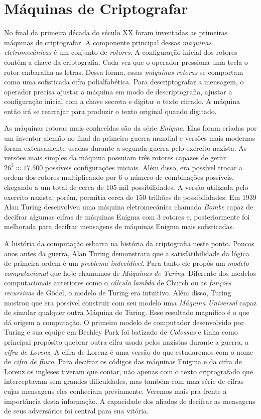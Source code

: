 \section{Máquinas de Criptografar}
\label{sec:maquinas}

No final da primeira década do século XX foram inventadas as primeiras máquinas de criptografar.
A componente principal dessas {\em maquinas eletromecânicas} é um conjunto de {\em rotores}.
A configuração inicial dos rotores contém a chave da criptografia.
Cada vez que o operador pressiona uma tecla o rotor embaralha as letras.
Dessa forma, essas {\em máquinas rotoras} se comportam como uma sofisticada cifra polialfabética.
Para descriptografar a mensagem, o operador precisa ajustar a máquina em modo de descriptografia, ajustar a configuração inicial com a chave secreta e digitar o texto cifrado.
A máquina então irá se rearrajar para produzir o texto original quando digitado.

As máquinas rotoras mais conhecidas são da série {\em Enigma}.
Elas foram criadas por um inventor alemão no final da primeira guerra mundial e versões mais modernas foram extensamente usadas durante a segunda guerra pelo exército nazista.
As versões mais simples da máquina possuiam três rotores capazes de gerar $26^3 \approx 17.500$ possíveis configurações iniciais.
Além disso, era possível trocar a ordem dos rotores multiplicando por $6$ o número de combinações possíveis, chegando a um total de cerca de $105$ mil possibilidades.
A versão utilizada pelo exercito nazista, porém, permitia cerca de $150$ trilhões de possibilidades.
Em 1939 Alan Turing desenvolveu uma máquina eletromecânica chamada {\em Bombe} capaz de decifrar algumas cifras de máquinas Enigma com 3 rotores e, posteriormente foi melhorada para decifrar mensagens de máquinas Enigma mais sofisticadas.

A história da computação esbarra na história da criptografia neste ponto.
Poucos anos antes da guerra, Alan Turing demonstrara que a satisfatibilidade da lógica de primeira ordem é um {\em problema indecidível}.
Para tanto ele propôs um {\em modelo computacional} que hoje chamamos de {\em Máquinas de Turing}.
Diferente dos modelos computacionais anteriores como o {\em cálculo lambda} de Church ou as {\em funções recursivas} de Gödel, o modelo de Turing era intuitivo.
Além disso, Turing mostrou que era possível construir com seu modelo uma {\em Máquina Universal} capaz de simular qualquer outra Máquina de Turing.
Esse resultado magnífico é o que dá origem a computação.
O primeiro modelo de computador desenvolvido por Turing e sua equipe em Bechley Park foi batizado de {\em Colossus} e tinha como principal propósito quebrar outra cifra usada pelos nazistas durante a guerra, a {\em cifra de Lorenz}.
A cifra de Lorenz é uma versão do que estudaremos com o nome de {\em cifra de fluxo}.
Para decifrar os códigos das máquinas Enigma e da cifra de Lorenz os ingleses tiveram que contar, não apenas com o texto criptografado que interceptavam sem grandes dificuldades, mas também com uma série de cifras cujas mensagens eles conheciam previamente.
Veremos mais pra frente a importância desta informação.
A capacidade dos aliados de decifrar as mensagens de seus adversários foi central para sua vitória.

